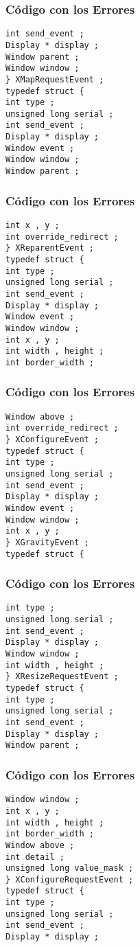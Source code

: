 \documentclass{beamer}
\begin{document}
\begin{frame}[fragile]
\frametitle{C\'odigo con los Errores}
\begin{verbatim}
int send_event ; 
Display * display ; 
Window parent ; 
Window window ; 
} XMapRequestEvent ; 
typedef struct { 
int type ; 
unsigned long serial ; 
int send_event ; 
Display * display ; 
Window event ; 
Window window ; 
Window parent ; 
\end{verbatim}
\end{frame}
\begin{frame}[fragile]
\frametitle{C\'odigo con los Errores}
\begin{verbatim}
int x , y ; 
int override_redirect ; 
} XReparentEvent ; 
typedef struct { 
int type ; 
unsigned long serial ; 
int send_event ; 
Display * display ; 
Window event ; 
Window window ; 
int x , y ; 
int width , height ; 
int border_width ; 
\end{verbatim}
\end{frame}
\begin{frame}[fragile]
\frametitle{C\'odigo con los Errores}
\begin{verbatim}
Window above ; 
int override_redirect ; 
} XConfigureEvent ; 
typedef struct { 
int type ; 
unsigned long serial ; 
int send_event ; 
Display * display ; 
Window event ; 
Window window ; 
int x , y ; 
} XGravityEvent ; 
typedef struct { 
\end{verbatim}
\end{frame}
\begin{frame}[fragile]
\frametitle{C\'odigo con los Errores}
\begin{verbatim}
int type ; 
unsigned long serial ; 
int send_event ; 
Display * display ; 
Window window ; 
int width , height ; 
} XResizeRequestEvent ; 
typedef struct { 
int type ; 
unsigned long serial ; 
int send_event ; 
Display * display ; 
Window parent ; 
\end{verbatim}
\end{frame}
\begin{frame}[fragile]
\frametitle{C\'odigo con los Errores}
\begin{verbatim}
Window window ; 
int x , y ; 
int width , height ; 
int border_width ; 
Window above ; 
int detail ; 
unsigned long value_mask ; 
} XConfigureRequestEvent ; 
typedef struct { 
int type ; 
unsigned long serial ; 
int send_event ; 
Display * display ; 
\end{verbatim}
\end{frame}
\end{document}
